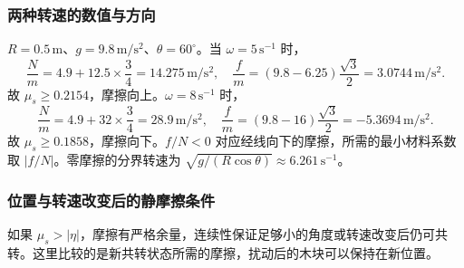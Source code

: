 \documentclass[UTF8,fontset=fandol,a4paper,11pt]{ctexart}
\begin{document}
\subsubsection*{两种转速的数值与方向}
$R=0.5\,\mathrm m$、$g=9.8\,\mathrm{m/s^2}$、$\theta=60^\circ$。当 $\omega=5\,\mathrm{s^{-1}}$ 时，
\[
\frac Nm=4.9+12.5\times\frac34=14.275\,\mathrm{m/s^2},
\quad \frac fm=(9.8-6.25)\frac{\sqrt3}{2}=3.0744\,\mathrm{m/s^2}.
\]
故 $\boxed{\mu_s\geq0.2154}$，摩擦向上。$\omega=8\,\mathrm{s^{-1}}$ 时，
\[
\frac Nm=4.9+32\times\frac34=28.9\,\mathrm{m/s^2},
\quad \frac fm=(9.8-16)\frac{\sqrt3}{2}=-5.3694\,\mathrm{m/s^2}.
\]
故 $\boxed{\mu_s\geq0.1858}$，摩擦向下。$f/N<0$ 对应经线向下的摩擦，所需的最小材料系数取 $|f/N|$。零摩擦的分界转速为 $\sqrt{g/(R\cos\theta)}\approx6.261\,\mathrm{s^{-1}}$。

\subsubsection*{位置与转速改变后的静摩擦条件}
如果 $\mu_s>|\eta|$，摩擦有严格余量，连续性保证足够小的角度或转速改变后仍可共转。这里比较的是新共转状态所需的摩擦，扰动后的木块可以保持在新位置。
\end{document}

